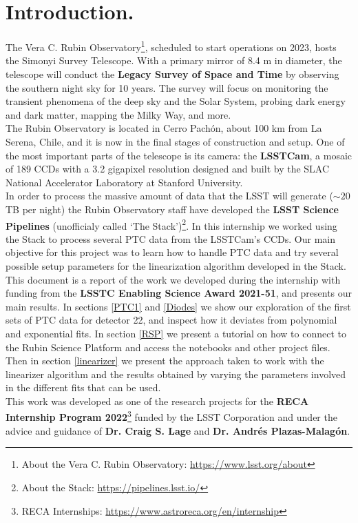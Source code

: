 \section{Introduction.}

\noindent The Vera C. Rubin Observatory\footnote{About the Vera C. Rubin Observatory: \url{https://www.lsst.org/about}}, scheduled to start operations on 2023, hosts the Simonyi Survey Telescope. With a primary mirror of 8.4 m in diameter, the telescope will conduct the \textbf{Legacy Survey of Space and Time} by observing the southern night sky for 10 years. The survey will focus on monitoring the transient phenomena of the deep sky and the Solar System, probing dark energy and dark matter, mapping the Milky Way, and more.\\

\noindent The Rubin Observatory is located in Cerro Pachón, about 100 km from La Serena, Chile, and it is now in the final stages of construction and setup. One of the most important parts of the telescope is its camera: the \textbf{LSSTCam}, a mosaic of 189 CCDs with a 3.2 gigapixel resolution designed and built by the SLAC National Accelerator Laboratory at Stanford University.\\

\noindent In order to process the massive amount of data that the LSST will generate ($\sim 20$ TB per night) the Rubin Observatory staff have developed the \textbf{LSST Science Pipelines} (unofficialy called `The Stack')\footnote{About the Stack: \url{https://pipelines.lsst.io/}}. In this internship we worked using the Stack to process several PTC data from the LSSTCam's CCDs. Our main objective for this project was to learn how to handle PTC data and try several possible setup parameters for the linearization algorithm developed in the Stack. \\

\noindent This document is a report of the work we developed during the internship with funding from the \textbf{LSSTC Enabling Science Award 2021-51}, and presents our main results. In sections \ref{PTC1} and \ref{Diodes} we show our exploration of the first sets of PTC data for detector 22, and inspect how it deviates from polynomial and exponential fits. In section \ref{RSP} we present a tutorial on how to connect to the Rubin Science Platform and access the notebooks and other project files. Then in section \ref{linearizer} we present the approach taken to work with the linearizer algorithm and the results obtained by varying the parameters involved in the different fits that can be used.\\

\noindent This work was developed as one of the research projects for the \textbf{RECA Internship Program 2022}\footnote{RECA Internships: \url{https://www.astroreca.org/en/internship}} funded by the LSST Corporation and under the advice and guidance of \textbf{Dr. Craig S. Lage} and \textbf{Dr. Andrés Plazas-Malagón}.\\